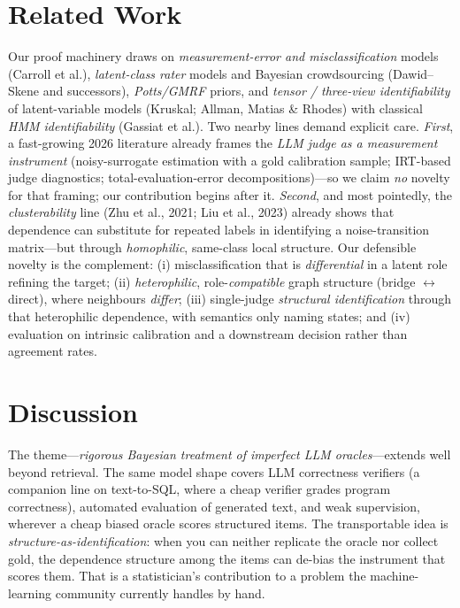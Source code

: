 \documentclass[11pt]{article}
\begin{document}
\section{Related Work}
Our proof machinery draws on \emph{measurement-error and misclassification} models (Carroll et al.),
\emph{latent-class rater} models and Bayesian crowdsourcing (Dawid--Skene and successors), \emph{Potts/GMRF}
priors, and \emph{tensor / three-view identifiability} of latent-variable models (Kruskal; Allman, Matias \&
Rhodes) with classical \emph{HMM identifiability} (Gassiat et al.). Two nearby lines demand explicit care.
\emph{First}, a fast-growing 2026 literature already frames the \emph{LLM judge as a measurement instrument}
(noisy-surrogate estimation with a gold calibration sample; IRT-based judge diagnostics; total-evaluation-error
decompositions)---so we claim \emph{no} novelty for that framing; our contribution begins after it.
\emph{Second}, and most pointedly, the \emph{clusterability} line (Zhu et al., 2021; Liu et al., 2023) already
shows that dependence can substitute for repeated labels in identifying a noise-transition matrix---but through
\emph{homophilic}, same-class local structure. Our defensible novelty is the complement: (i) misclassification
that is \emph{differential} in a latent role refining the target; (ii) \emph{heterophilic}, role-\emph{compatible}
graph structure (bridge $\leftrightarrow$ direct), where neighbours \emph{differ}; (iii) single-judge
\emph{structural identification} through that heterophilic dependence, with semantics only naming states; and
(iv) evaluation on intrinsic calibration and a downstream decision rather than agreement rates.

\section{Discussion}
The theme---\emph{rigorous Bayesian treatment of imperfect LLM oracles}---extends well beyond retrieval. The
same model shape covers LLM correctness verifiers (a companion line on text-to-SQL, where a cheap verifier
grades program correctness), automated evaluation of generated text, and weak supervision, wherever a cheap
biased oracle scores structured items. The transportable idea is \emph{structure-as-identification}: when you
can neither replicate the oracle nor collect gold, the dependence structure among the items can de-bias the
instrument that scores them. That is a statistician's contribution to a problem the machine-learning community
currently handles by hand.
\end{document}

